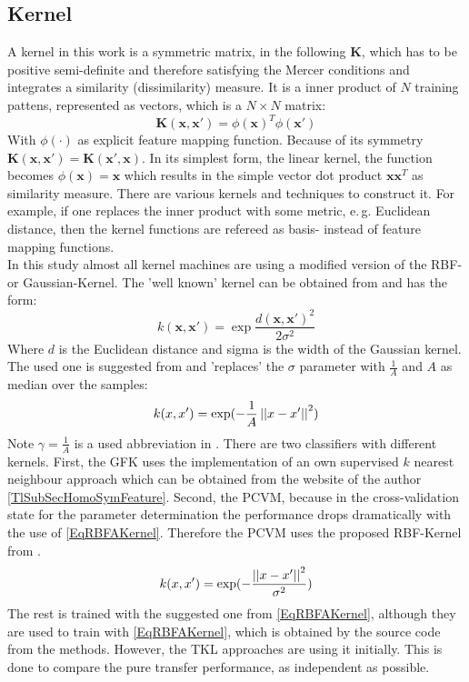 \subsection{Kernel}\label{EmSubSecKernel}
A kernel in this work is a symmetric matrix, in the following $\mathbf{K}$, which has to be positive semi-definite and therefore satisfying the Mercer conditions and integrates a similarity (dissimilarity) measure.
It is a inner product of $N$ training pattens, represented as vectors, which is a $N \times N$ matrix:
\begin{equation}
	\mathbf{K}(\mathbf{x},\mathbf{x'}) = \phi(\mathbf{x})^T\phi(\mathbf{x'})
\end{equation}
With $\phi(\cdot)$ as explicit feature mapping function.
Because of its symmetry $\mathbf{K}(\mathbf{x},\mathbf{x'})=\mathbf{K}(\mathbf{x'},\mathbf{x})$.
In its simplest form, the linear kernel, the function becomes $\phi(\mathbf{x}) = \mathbf{x}$ which results in the simple vector dot product $\mathbf{x}\mathbf{x}^T$ as similarity measure. There are various kernels and techniques to construct it. For example, if one replaces the inner product with some metric, e.\,g. Euclidean distance, then the kernel functions are refereed as basis- instead of feature mapping functions.\cite[p. 291-296, 329]{Bishop.2009}\\
In this study almost all kernel machines are using a modified version of the \ac{RBF}- or Gaussian-Kernel.
The 'well known' kernel can be obtained from \cite[p. 17]{Vert.2004} and has the form:
\begin{equation}\label{EqRBFOriginalKernel}
	k(\mathbf{x},\mathbf{x}') = \exp\frac{d(\mathbf{x},\mathbf{x}')^2}{2\sigma^2}
\end{equation}
Where $d$ is the Euclidean distance and sigma is the width of the Gaussian kernel.\\
The used one is suggested from \cite{Duan.2012} and 'replaces' the $\sigma$ parameter with $\frac{1}{A}$ and $A$ as median over the samples: 
\begin{equation}\label{EqRBFAKernel}
	k(x,x') = \exp(-\frac{1}{A}\left\vert\left\vert x-x'\right\vert\right\vert^2)
\end{equation} 
Note $\gamma = \frac{1}{A}$ is a used abbreviation in \cite{Long.2015}.
There are two classifiers with different kernels.
First, the \acs{GFK} uses the implementation of an own supervised $k$ nearest neighbour approach which can be obtained from the website of the author \ref{TlSubSecHomoSymFeature}.
Second, the \acs{PCVM}, because in the cross-validation state for the parameter determination the performance drops dramatically with the use of \eqref{EqRBFAKernel}.
Therefore the \acs{PCVM} uses the proposed \acs{RBF}-Kernel from \cite{Chen.2009}. 
\begin{equation}\label{RBFKernelPCVM}
k(x,x') = \exp(-\frac{\left\vert\left\vert x-x'\right\vert\right\vert^2}{\sigma^2})
\end{equation}
The rest is trained with the suggested one from \eqref{EqRBFAKernel}, although they are used to train with \eqref{EqRBFAKernel}, which is obtained by the source code from the methods.
However, the \acs{TKL} approaches are using it initially.
This is done to compare the pure transfer performance, as independent as possible.

